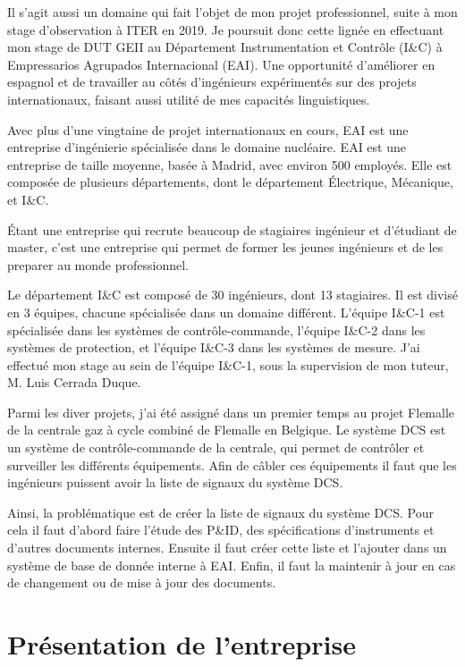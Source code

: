 \documentclass[11pt, openright]{book}
\begin{document}
Il s'agit aussi un domaine qui fait l'objet de mon projet professionnel, suite à mon stage d'obser\-vation à ITER en 2019. Je poursuit donc cette lignée en effectuant mon stage de DUT GEII au Département Instrumentation et Contrôle (I\&C) à Empressarios Agrupados Internacional (EAI). Une opportunité d'améliorer en espagnol et de travailler au côtés d'ingénieurs expérimentés sur des projets internationaux, faisant aussi utilité de mes capacités linguistiques. %

Avec plus d'une vingtaine de projet internationaux en cours, EAI est une entreprise d'ingénierie spécialisée dans le domaine nucléaire. EAI est une entreprise de taille moyenne, basée à Madrid, avec environ 500 employés. Elle est composée de plusieurs départements, dont le département Électrique, Mécanique, et I\&C.

Étant une entreprise qui recrute beaucoup de stagiaires ingénieur et  d'étudiant de master, c'est une entreprise qui permet de former les jeunes ingénieurs et de les preparer au monde professionnel.

Le département I\&C est composé de 30 ingénieurs, dont 13 stagiaires. Il est divisé en 3 équipes, chacune spécialisée dans un domaine différent. L'équipe I\&C-1 est spécialisée dans les systèmes de contrôle-commande, l'équipe I\&C-2 dans les systèmes de protection, et l'équipe I\&C-3 dans les systèmes de mesure. J'ai effectué mon stage au sein de l'équipe I\&C-1, sous la supervision de mon tuteur, M. Luis Cerrada Duque.

Parmi les diver projets, j'ai été assigné dans un premier temps au projet Flemalle de la centrale gaz à cycle combiné de Flemalle en Belgique. Le système DCS est un système de contrôle-commande de la centrale, qui permet de contrôler et surveiller les différents équipements. Afin de câbler ces équipements il faut que les ingénieurs puissent avoir la liste de signaux du système DCS.

Ainsi, la problématique est de créer la liste de signaux du système DCS. Pour cela il faut d'abord faire l'étude des P\&ID, des spécifications d'instruments et d'autres documents internes. Ensuite il faut créer cette liste et l'ajouter dans un système de base de donnée interne à EAI. Enfin, il faut la maintenir à jour en cas de changement ou de mise à jour des documents.



\newpage

\section{Présentation de l'entreprise}
\end{document}
